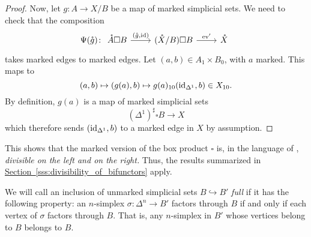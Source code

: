 \documentclass[main.tex]{subfiles}
\begin{document}
\begin{proof}
  Now, let $g\colon A \to X / B$ be a map of marked simplicial sets. We need to check that the composition
  \begin{equation*}
    \Psi(\mathring{g})\colon
    \begin{tikzcd}
      \mathring{A} \square B
      \arrow[r, "{(\mathring{g}, \id)}"]
      & (\mathring{X} / B) \square B
      \arrow[r, "\ev'"]
      & \mathring{X}
    \end{tikzcd}
  \end{equation*}
  takes marked edges to marked edges. Let $(a, b) \in A_{1} \times B_{0}$, with $a$ marked. This maps to
  \begin{equation*}
    (a, b) \mapsto (g(a), b) \mapsto g(a)_{10}(\mathrm{id}_{\Delta^{1}}, b) \in X_{10}.
  \end{equation*}
  By definition, $g(a)$ is a map of marked simplicial sets
  \begin{equation*}
    (\Delta^{1})^{\sharp} \square B \to X
  \end{equation*}
  which therefore sends $(\mathrm{id}_{\Delta^{1}}, b)$ to a marked edge in $X$ by assumption.
\end{proof}

This shows that the marked version of the box product $\square$ is, in the language of \cite{qcats_vs_segal_spaces}, \emph{divisible on the left and on the right.} Thus, the results summarized in \hyperref[sss:divisibility_of_bifunctors]{Section~\ref*{sss:divisibility_of_bifunctors}} apply.

\begin{definition}
  \label{def:full_inclusion}
  We will call an inclusion of unmarked simplicial sets $B \hookrightarrow B'$ \emph{full} if it has the following property: an $n$-simplex $\sigma\colon \Delta^{n} \to B'$ factors through $B$ if and only if each vertex of $\sigma$ factors through $B$. That is, any $n$-simplex in $B'$ whose vertices belong to $B$ belongs to $B$.
\end{definition}
\end{document}
